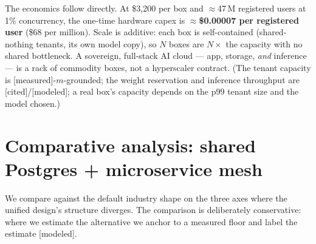 \documentclass[11pt]{article}
\newcommand{\meas}{\textcolor{blue!60!black}{\small[measured]}}
\newcommand{\modeled}{\textcolor{orange!70!black}{\small[modeled]}}
\newcommand{\cited}{\textcolor{purple!70!black}{\small[cited]}}
\begin{document}
\begin{table}[h]
\centering
\caption{``Cloud in a box'': tenant capacity of one 128\,GB unified-memory box after reserving
model weights $+$ engine $+$ OS. Active-tenant counts use the \meas{} $m$; registered-user counts
apply the stated concurrency; weight reservations are \cited{}/\modeled{}. Capex is the \$3{,}200
box price $\div$ registered users at 1\% concurrency.}
\label{tab:box}
\end{table}

The economics follow directly. At \$3{,}200 per box and $\approx$47\,M registered users at 1\%
concurrency, the one-time hardware capex is \textbf{$\approx$\$0.00007 per registered user}
(\$68 per million). Scale is additive: each box is self-contained (shared-nothing tenants, its own
model copy), so $N$ boxes are $N\times$ the capacity with no shared bottleneck. A sovereign,
full-stack AI cloud --- app, storage, \emph{and} inference --- is a rack of commodity boxes, not a
hyperscaler contract. (The tenant capacity is \meas{}-$m$-grounded; the weight reservation and
inference throughput are \cited{}/\modeled{}; a real box's capacity depends on the p99 tenant size
and the model chosen.)

\section{Comparative analysis: shared Postgres + microservice mesh}
\label{sec:compare}
We compare against the default industry shape on the three axes where the unified design's
structure diverges. The comparison is deliberately conservative: where we estimate the
alternative we anchor to a measured floor and label the estimate \modeled{}.
\end{document}
